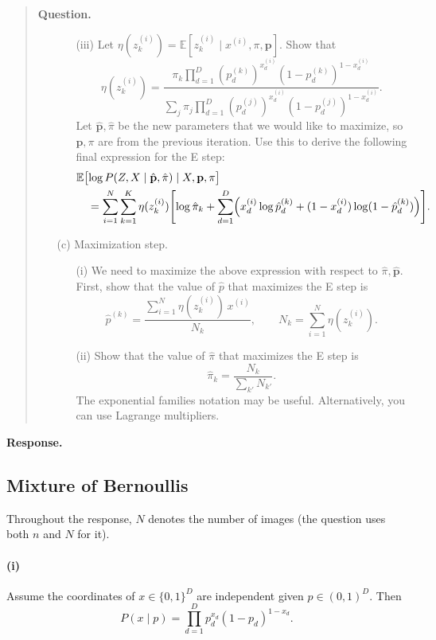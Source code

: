 \documentclass[11pt]{article}
\newenvironment{question}{%
  \par\addvspace{0.8em}%
  \begin{quote}\small
  \noindent\textbf{Question.}\enspace\ignorespaces
}{%
  \end{quote}%
  \par\nopagebreak
  \noindent\textbf{Response.}\par\nopagebreak\smallskip
}
\newcommand{\E}{\mathbb{E}}
\begin{document}
\begin{question}
\begin{enumerate}
\begin{enumerate}
    \item[(iii)] Let \(\eta(z^{(i)}_k)=\E[z^{(i)}_k\mid x^{(i)},\pi,\mathbf{p}]\). Show that
    \[
      \eta(z^{(i)}_k)
      =\frac{
        \pi_k\prod_{d=1}^D
        (p^{(k)}_d)^{x^{(i)}_d}(1-p^{(k)}_d)^{1-x^{(i)}_d}
      }{
        \sum_j\pi_j\prod_{d=1}^D
        (p^{(j)}_d)^{x^{(i)}_d}(1-p^{(j)}_d)^{1-x^{(i)}_d}
      }.
    \]
    Let \(\hat{\mathbf{p}},\hat\pi\) be the new parameters that we would like to maximize, so \(\mathbf{p},\pi\) are from the previous iteration. Use this to derive the following final expression for the E step:
    \begin{align*}
      &\E\bigl[\log P(Z,X\mid\hat{\mathbf{p}},\hat\pi)\mid X,\mathbf{p},\pi\bigr]\\
      &\quad=
      \sum_{i=1}^N\sum_{k=1}^K
      \eta(z^{(i)}_k)
      \Biggl[
        \log\hat\pi_k
        +\sum_{d=1}^D
        \Bigl(
          x^{(i)}_d\log\hat p^{(k)}_d
          +(1-x^{(i)}_d)\log(1-\hat p^{(k)}_d)
        \Bigr)
      \Biggr].
    \end{align*}
  \end{enumerate}
  \item[(c)] Maximization step.
  \begin{enumerate}
    \item[(i)] We need to maximize the above expression with respect to \(\hat\pi,\hat{\mathbf{p}}\). First, show that the value of \(\hat p\) that maximizes the E step is
    \[
      \hat p^{(k)}
      =\frac{\sum_{i=1}^N\eta(z^{(i)}_k)\,x^{(i)}}{N_k},
      \qquad
      N_k=\sum_{i=1}^N\eta(z^{(i)}_k).
    \]
    \item[(ii)] Show that the value of \(\hat\pi\) that maximizes the E step is
    \[
      \hat\pi_k=\frac{N_k}{\sum_{k'}N_{k'}}.
    \]
    The exponential families notation may be useful. Alternatively, you can use Lagrange multipliers.
  \end{enumerate}
\end{enumerate}
\end{question}

\subsection{Mixture of Bernoullis}

Throughout the response, \(N\) denotes the number of images (the
question uses both \(n\) and \(N\) for it).

\paragraph{(i)}
Assume the coordinates of \(x\in\{0,1\}^D\) are independent given
\(p\in(0,1)^D\). Then
\begin{equation}
  P(x\mid p)
  =\prod_{d=1}^D p_d^{x_d}(1-p_d)^{1-x_d}.
\end{equation}
\end{document}

